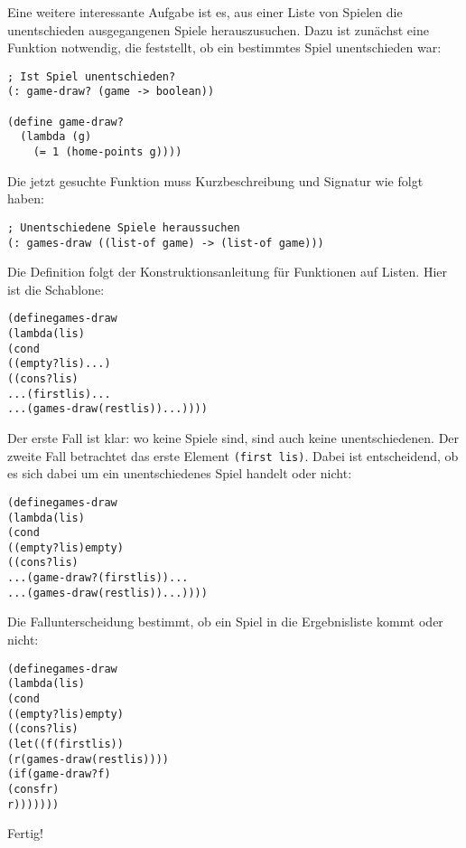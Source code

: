 Eine weitere interessante Aufgabe ist es, aus einer Liste von Spielen die
unentschieden ausgegangenen Spiele herauszusuchen. Dazu ist zunächst eine
Funktion notwendig, die feststellt, ob ein bestimmtes Spiel unentschieden war:
\begin{verbatim}
; Ist Spiel unentschieden?
(: game-draw? (game -> boolean))

(define game-draw?
  (lambda (g)
    (= 1 (home-points g))))
\end{verbatim}
Die jetzt gesuchte Funktion muss Kurzbeschreibung und Signatur wie folgt haben:
\begin{verbatim}
; Unentschiedene Spiele heraussuchen
(: games-draw ((list-of game) -> (list-of game)))
\end{verbatim}
%
Die Definition folgt der Konstruktionsanleitung für Funktionen auf Listen.
Hier ist die Schablone:
%
\begin{alltt}
(define games-draw
  (lambda (lis)
    (cond
      ((empty? lis) ...)
      ((cons? lis)
       ... (first lis) ...
       ... (games-draw (rest lis)) ...))))
\end{alltt}
%
Der erste Fall ist klar: wo keine Spiele sind, sind auch keine
unentschiedenen.  Der zweite Fall betrachtet das erste Element \texttt{(first
  lis)}.  Dabei ist entscheidend, ob es sich dabei um ein unentschiedenes Spiel
handelt oder nicht:
%
\begin{alltt}
(define games-draw
  (lambda (lis)
    (cond
      ((empty? lis) empty)
      ((cons? lis)
       ... (game-draw? (first lis)) ...
       ... (games-draw (rest lis)) ...))))
\end{alltt}
%
Die Fallunterscheidung bestimmt, ob ein Spiel in die Ergebnisliste kommt oder
nicht:
%
\begin{alltt}
(define games-draw
  (lambda (lis)
    (cond
      ((empty? lis) empty)
      ((cons? lis)
       (let ((f (first lis))
             (r (games-draw (rest lis))))
       (if (game-draw? f)
           (cons f r)
           r)))))))
\end{alltt}
%
Fertig!

